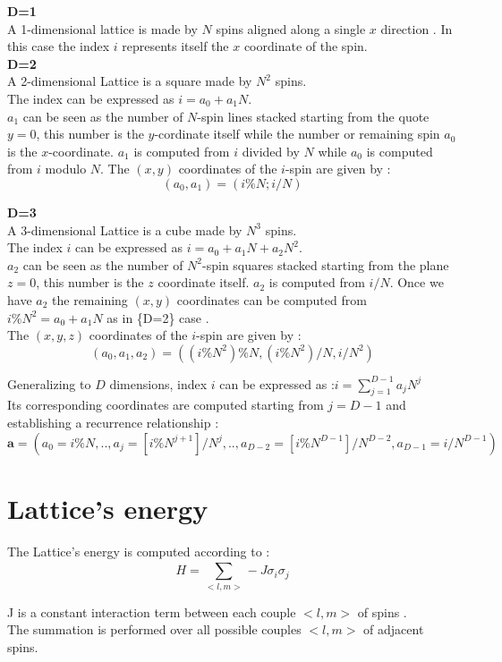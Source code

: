 \documentclass[11]{article}
\begin{document}
\vspace{0.1cm} 
\textbf{D=1} \\
A 1-dimensional lattice is made by $N$ spins aligned along a single $x$ direction .
In this case the index $i$ represents itself the $x$ coordinate of the spin.\\

\textbf{D=2} \\
A 2-dimensional Lattice is a square made by $N^2$ spins.\\
The index can be expressed as $i = a_0 + a_1N$. \\
$a_1$ can be seen as the number of $N$-spin lines stacked starting from the quote $y=0$, this number is
the $y$-cordinate itself while the number or remaining spin $a_0$ is the $x$-coordinate. 
$a_1$ is computed from $i$ divided by $N$ while $a_0$ is computed from $i$ modulo $N$.
The $(x,y)$ coordinates of the $i$-spin are given by : $$(a_0,a_1)=(i\%N ; i/N)$$ 


\textbf{D=3} \\
A 3-dimensional Lattice is a cube made by $N^{3}$ spins. \\  
The index $i$ can be expressed as $i = a_0 + a_1N + a_2N^2$. \\
$a_2$ can be seen as the number of $N^2$-spin squares stacked starting from the plane $z=0$, this number is 
the $z$ coordinate itself. $a_2$ is computed from $i/N$.
Once we have $a_2$ the remaining $(x,y)$ coordinates can be computed from \\ $i\%N^2 = a_0 + a_1N$ as in \{D=2\} case .\\
The $(x,y,z)$ coordinates of the $i$-spin are given by : $$(a_0,a_1,a_2)=\left( (i\%N^2)\%N , (i\%N^2)/N , i/N^2 \right)$$ 

Generalizing to $D$ dimensions, index $i$ can be expressed as :$ i = \sum_{j=1}^{D-1}a_jN^j $ \\
Its corresponding coordinates are computed starting from $j=D-1$ and establishing a recurrence relationship :
$$\mathbf{a} = \left(a_0 = i\%N ,.., a_j = [i\%N^{j+1}]/N^j ,.., a_{D-2} = [i\% N^{D-1}]/N^{D-2} , a_{D-1} = i/N^{D-1}\right)$$ 
 
\section*{Lattice's energy } 

The Lattice's energy is computed according to : 
$$H = \sum_{<l,m>}^{} -J\sigma_i\sigma_j $$

J is a constant interaction term between each couple $<l,m>$ of spins .\\
The summation is performed over all possible couples $<l,m>$ of adjacent spins.\\
\end{document}
